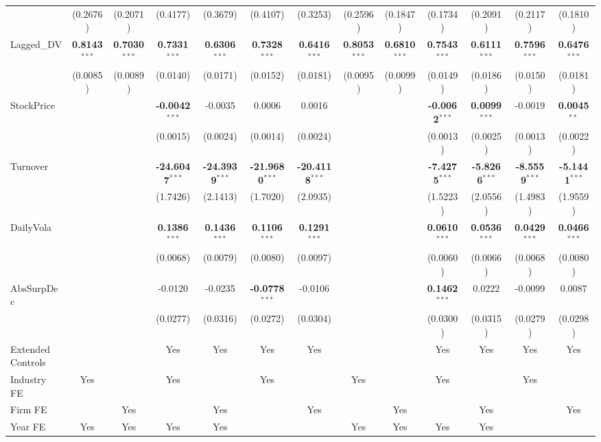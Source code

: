 \begin{landscape}
\begin{table}[H]
\begin{tabular}{lcccccccccccc}
 & (0.2676) & (0.2071) & (0.4177) & (0.3679) & (0.4107) & (0.3253) & (0.2596) & (0.1847) & (0.1734) & (0.2091) & (0.2117) & (0.1810) \\
Lagged\_DV & \textbf{0.8143}$^{***}$ & \textbf{0.7030}$^{***}$ & \textbf{0.7331}$^{***}$ & \textbf{0.6306}$^{***}$ & \textbf{0.7328}$^{***}$ & \textbf{0.6416}$^{***}$ & \textbf{0.8053}$^{***}$ & \textbf{0.6810}$^{***}$ & \textbf{0.7543}$^{***}$ & \textbf{0.6111}$^{***}$ & \textbf{0.7596}$^{***}$ & \textbf{0.6476}$^{***}$ \\
 & (0.0085) & (0.0089) & (0.0140) & (0.0171) & (0.0152) & (0.0181) & (0.0095) & (0.0099) & (0.0149) & (0.0186) & (0.0150) & (0.0181) \\
StockPrice &  &  & \textbf{-0.0042}$^{***}$ & -0.0035 & 0.0006 & 0.0016 &  &  & \textbf{-0.0062}$^{***}$ & \textbf{0.0099}$^{***}$ & -0.0019 & \textbf{0.0045}$^{**}$ \\
 &  &  & (0.0015) & (0.0024) & (0.0014) & (0.0024) &  &  & (0.0013) & (0.0025) & (0.0013) & (0.0022) \\
Turnover &  &  & \textbf{-24.6047}$^{***}$ & \textbf{-24.3939}$^{***}$ & \textbf{-21.9680}$^{***}$ & \textbf{-20.4118}$^{***}$ &  &  & \textbf{-7.4275}$^{***}$ & \textbf{-5.8266}$^{***}$ & \textbf{-8.5559}$^{***}$ & \textbf{-5.1441}$^{***}$ \\
 &  &  & (1.7426) & (2.1413) & (1.7020) & (2.0935) &  &  & (1.5223) & (2.0556) & (1.4983) & (1.9559) \\
DailyVola &  &  & \textbf{0.1386}$^{***}$ & \textbf{0.1436}$^{***}$ & \textbf{0.1106}$^{***}$ & \textbf{0.1291}$^{***}$ &  &  & \textbf{0.0610}$^{***}$ & \textbf{0.0536}$^{***}$ & \textbf{0.0429}$^{***}$ & \textbf{0.0466}$^{***}$ \\
 &  &  & (0.0068) & (0.0079) & (0.0080) & (0.0097) &  &  & (0.0060) & (0.0066) & (0.0068) & (0.0080) \\
AbsSurpDec &  &  & -0.0120 & -0.0235 & \textbf{-0.0778}$^{***}$ & -0.0106 &  &  & \textbf{0.1462}$^{***}$ & 0.0222 & -0.0099 & 0.0087 \\
 &  &  & (0.0277) & (0.0316) & (0.0272) & (0.0304) &  &  & (0.0300) & (0.0315) & (0.0279) & (0.0298) \\
\midrule
Extended Controls &  &  & Yes & Yes & Yes & Yes &  &  & Yes & Yes & Yes & Yes \\
Industry FE & Yes &  & Yes &  & Yes &  & Yes &  & Yes &  & Yes &  \\
Firm FE &  & Yes &  & Yes &  & Yes &  & Yes &  & Yes &  & Yes \\
Year FE & Yes & Yes & Yes & Yes &  &  & Yes & Yes & Yes & Yes &  &  \\

\end{tabular}
\end{table}
\end{landscape}
